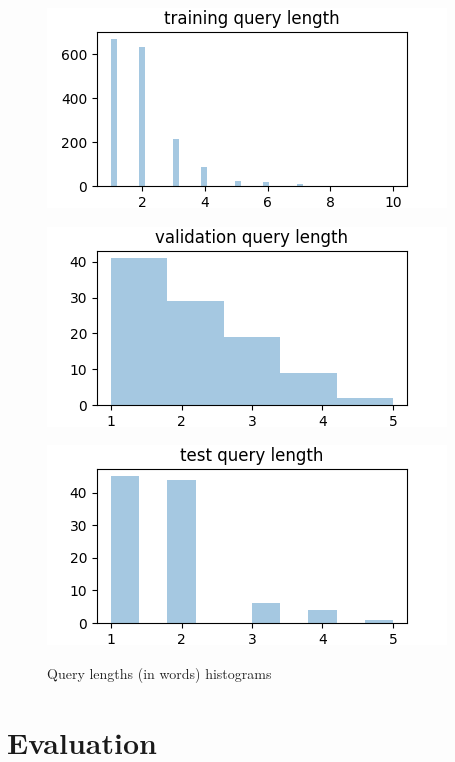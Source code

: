 \documentclass{article}
\begin{document}
\begin{figure}[h!]
\centering
\includegraphics[scale=0.7]{images/training_query_length.png}
\label{fig:universe}
\end{figure}

\begin{figure}[h!]
\centering
\includegraphics[scale=0.7]{images/validation_query_length.png}
\label{fig:universe}
\end{figure}

\begin{figure}[h!]
\centering
\includegraphics[scale=0.7]{images/test_query_length.png}
\label{fig:universe}
\caption{Query lengths (in words) histograms}
\end{figure}

\section{Evaluation}
\end{document}
